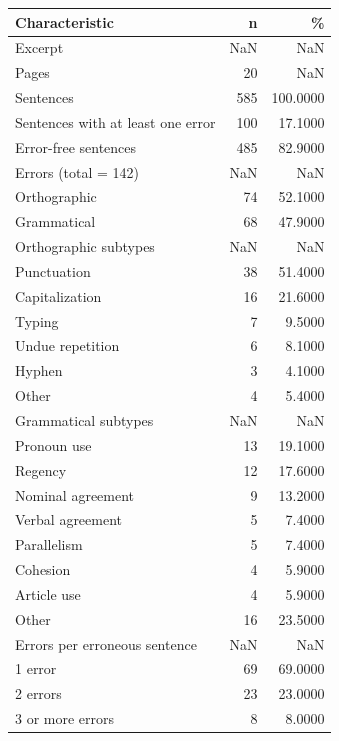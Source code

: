 \begin{tabular}{lrr}
\toprule
Characteristic & n & \% \\
\midrule
Excerpt & NaN & NaN \\
Pages & 20 & NaN \\
Sentences & 585 & 100.0000 \\
Sentences with at least one error & 100 & 17.1000 \\
Error-free sentences & 485 & 82.9000 \\
Errors (total = 142) & NaN & NaN \\
Orthographic & 74 & 52.1000 \\
Grammatical & 68 & 47.9000 \\
Orthographic subtypes & NaN & NaN \\
Punctuation & 38 & 51.4000 \\
Capitalization & 16 & 21.6000 \\
Typing & 7 & 9.5000 \\
Undue repetition & 6 & 8.1000 \\
Hyphen & 3 & 4.1000 \\
Other & 4 & 5.4000 \\
Grammatical subtypes & NaN & NaN \\
Pronoun use & 13 & 19.1000 \\
Regency & 12 & 17.6000 \\
Nominal agreement & 9 & 13.2000 \\
Verbal agreement & 5 & 7.4000 \\
Parallelism & 5 & 7.4000 \\
Cohesion & 4 & 5.9000 \\
Article use & 4 & 5.9000 \\
Other & 16 & 23.5000 \\
Errors per erroneous sentence & NaN & NaN \\
1 error & 69 & 69.0000 \\
2 errors & 23 & 23.0000 \\
3 or more errors & 8 & 8.0000 \\
\bottomrule
\end{tabular}
